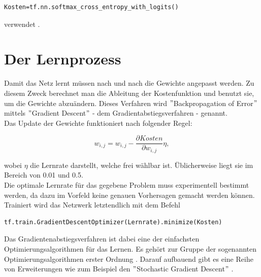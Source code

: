 \vspace{0.3cm} 
\begin{lstlisting}
Kosten=tf.nn.softmax_cross_entropy_with_logits()
\end{lstlisting}

verwendet \cite{cookbook}.



\section{Der Lernprozess}
Damit das Netz lernt m\"ussen nach und nach die Gewichte angepasst werden. Zu diesem Zweck berechnet man die Ableitung der Kostenfunktion und benutzt sie, um die Gewichte abzu\"andern. Dieses Verfahren wird $"$Backpropagation of Error$"$ mittels $"$Gradient Descent$"$ - dem Gradientabstiegsverfahren - genannt.\\
Das Update der Gewichte funktioniert nach folgender Regel: \cite{Rojas1996}

\begin{equation}
w_{i,j}=w_{i,j}-\frac{\partial Kosten }{\partial w_{i,j}}\eta,
\end{equation}

wobei $\eta$ die Lernrate darstellt, welche frei w\"ahlbar ist. \"Ublicherweise liegt sie im Bereich von 0.01 und 0.5.\\
Die optimale Lernrate f\"ur das gegebene Problem muss experimentell bestimmt werden, da dazu im Vorfeld keine genauen Vorhersagen gemacht werden können.
Trainiert wird das Netzwerk letztendlich mit dem Befehl \cite{building}

\vspace{0.3cm}
\begin{lstlisting}
tf.train.GradientDescentOptimizer(Lernrate).minimize(Kosten)
\end{lstlisting}

Das Gradientenabstiegsverfahren ist dabei eine der einfachsten Optimierungsalgorithmen für das Lernen. Es gehört zur Gruppe der sogenannten Optimierungsalgorithmen erster Ordnung \cite{Goodfellow}. Darauf aufbauend gibt es eine Reihe von Erweiterungen wie zum Beispiel den $"$Stochastic Gradient Descent$"$ \cite{Goodfellow}.